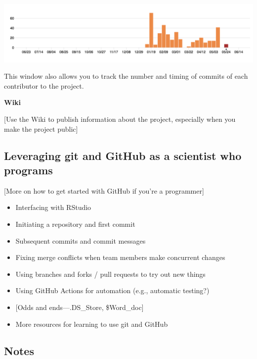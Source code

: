 \documentclass[]{tufte-book}
\providecommand{\tightlist}{%
  \setlength{\itemsep}{0pt}\setlength{\parskip}{0pt}}
\begin{document}
\includegraphics[width=20.53in]{figures/github_commit_frequency}

This window also allows you to track the number and timing of commits of each contributor
to the project.

\textbf{Wiki}

{[}Use the Wiki to publish information about the project, especially when you make the
project public{]}

\hypertarget{leveraging-git-and-github-as-a-scientist-who-programs}{%
\subsection{Leveraging git and GitHub as a scientist who programs}\label{leveraging-git-and-github-as-a-scientist-who-programs}}

{[}More on how to get started with GitHub if you're a programmer{]}

\begin{itemize}
\tightlist
\item
  Interfacing with RStudio
\item
  Initiating a repository and first commit
\item
  Subsequent commits and commit messages
\item
  Fixing merge conflicts when team members make concurrent changes
\item
  Using branches and forks / pull requests to try out new things
\item
  Using GitHub Actions for automation (e.g., automatic testing?)
\item
  {[}Odds and ends---.DS\_Store, \$Word\_doc{]}
\item
  More resources for learning to use git and GitHub
\end{itemize}

\hypertarget{notes}{%
\subsection{Notes}\label{notes}}
\end{document}
